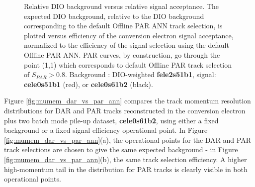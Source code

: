 \begin{figure}[H]
\caption{
  \label{fig:mumem_ann_operational_point_choice}
  Relative DIO background versus relative signal acceptance.
  The expected DIO background, relative to the DIO background corresponding to the default Offline
  PAR ANN track selection,
  is plotted versus efficiency of the conversion electron signal acceptance, normalized to the efficiency
  of the signal selection using the default Offline PAR ANN.
  PAR curves, by construction, go through the point (1,1) which corresponds to default Offline PAR track selection
  of $S_{PAR} > 0.8$.
  Background : DIO-weighted {\bf fele2s51b1}, signal: {\bf cele0s51b1} (red), or {\bf cele0s61b2} (black).
}
\end{figure}

Figure \ref{fig:mumem_dar_vs_par_ann} compares the track momentum resolution distributions 
for DAR and PAR tracks reconstructed in the conversion electron plus two batch mode pile-up dataset,
{\bf cele0s61b2}, using either a fixed background or a fixed signal efficiency operational point. 
In Figure \ref{fig:mumem_dar_vs_par_ann}(a), the operational points for the DAR
and PAR track selections are chosen to give the same expected background -
in Figure \ref{fig:mumem_dar_vs_par_ann}(b), the same track selection efficiency. A higher 
high-momentum tail in the distribution for PAR tracks is clearly visible in both operational points.


